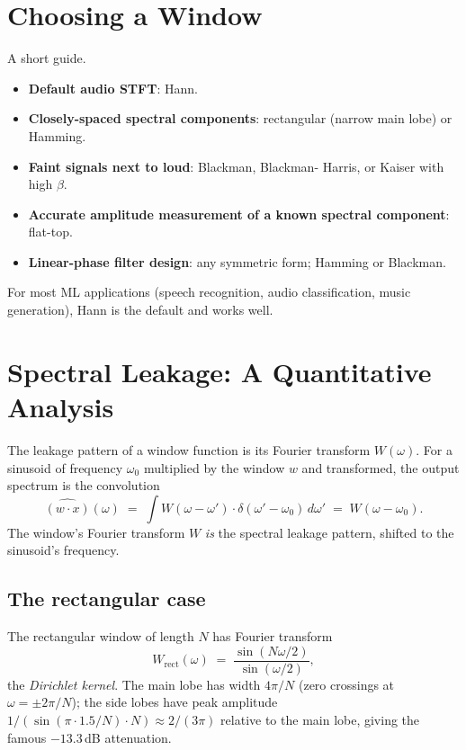 \section{Choosing a Window}
\label{sec:signal_windows:choosing}

A short guide.

\begin{itemize}
  \item \textbf{Default audio STFT}: Hann.
  \item \textbf{Closely-spaced spectral components}: rectangular
    (narrow main lobe) or Hamming.
  \item \textbf{Faint signals next to loud}: Blackman, Blackman-
    Harris, or Kaiser with high $\beta$.
  \item \textbf{Accurate amplitude measurement of a known
    spectral component}: flat-top.
  \item \textbf{Linear-phase filter design}: any symmetric form;
    Hamming or Blackman.
\end{itemize}

For most ML applications (speech recognition, audio
classification, music generation), Hann is the default and works
well.

\section{Spectral Leakage: A Quantitative Analysis}
\label{sec:signal_windows:leakage_quant}

The leakage pattern of a window function is its Fourier transform
$W(\omega)$. For a sinusoid of frequency $\omega_0$ multiplied by
the window $w$ and transformed, the output spectrum is the
convolution
\[
\widehat{(w \cdot x)}(\omega)
\;=\; \int W(\omega - \omega') \cdot \delta(\omega' - \omega_0)\, d\omega'
\;=\; W(\omega - \omega_0).
\]
The window's Fourier transform $W$ \emph{is} the spectral leakage
pattern, shifted to the sinusoid's frequency.

\subsection{The rectangular case}
\label{ssec:signal_windows:rect_dft}

The rectangular window of length $N$ has Fourier transform
\[
W_{\mathrm{rect}}(\omega) \;=\; \frac{\sin(N\omega/2)}{\sin(\omega/2)},
\]
the \emph{Dirichlet kernel}. The main lobe has width $4\pi/N$
(zero crossings at $\omega = \pm 2\pi/N$); the side lobes have
peak amplitude $1/(\sin(\pi \cdot 1.5/N) \cdot N) \approx
2/(3\pi)$ relative to the main lobe, giving the famous
$-13.3$\,dB attenuation.

